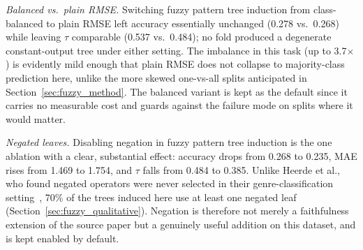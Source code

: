 \emph{Balanced vs.\ plain RMSE.} Switching fuzzy pattern tree induction from class-balanced to plain RMSE left accuracy essentially unchanged (0.278 vs.\ 0.268) while leaving $\tau$ comparable (0.537 vs.\ 0.484); no fold produced a degenerate constant-output tree under either setting. The imbalance in this task (up to 3.7$\times$) is evidently mild enough that plain RMSE does not collapse to majority-class prediction here, unlike the more skewed one-vs-all splits anticipated in Section~\ref{sec:fuzzy_method}. The balanced variant is kept as the default since it carries no measurable cost and guards against the failure mode on splits where it would matter.

\emph{Negated leaves.} Disabling negation in fuzzy pattern tree induction is the one ablation with a clear, substantial effect: accuracy drops from 0.268 to 0.235, MAE rises from 1.469 to 1.754, and $\tau$ falls from 0.484 to 0.385. Unlike Heerde et al., who found negated operators were never selected in their genre-classification setting~\cite{heerde2020comparing}, 70\% of the trees induced here use at least one negated leaf (Section~\ref{sec:fuzzy_qualitative}). Negation is therefore not merely a faithfulness extension of the source paper but a genuinely useful addition on this dataset, and is kept enabled by default.
